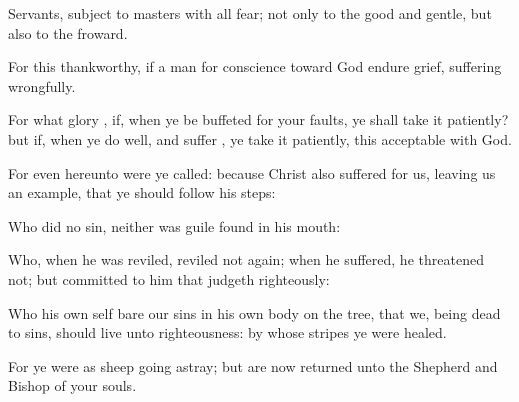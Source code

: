 {Servants,
{}
subject
to
{}
masters
with
all
fear;
not
only to the
good
and
gentle,
but
also to the
froward.

For
this
{}
thankworthy,
if a
man
for
conscience toward
God
endure
grief,
suffering
wrongfully.

For
what
glory
{},
if,
when ye be
buffeted for your
faults, ye shall take it
patiently?
but
if, when ye do
well,
and
suffer
{}, ye take it
patiently,
this
{}
acceptable
with
God.

For
even
hereunto were ye
called:
because
Christ
also
suffered
for
us,
leaving
us an
example,
that ye should
follow
his
steps:

Who
did
no
sin,
neither
was
guile
found
in
his
mouth:

Who, when he was
reviled,
reviled
not
again; when he
suffered, he
threatened
not;
but
committed
{} to him that
judgeth
righteously:

Who his own
self
bare
our
sins
in his
own
body
on the
tree,
that
we, being
dead to
sins, should
live unto
righteousness: by
whose
stripes ye were
healed.

For ye
were
as
sheep going
astray;
but
are
now
returned
unto the
Shepherd
and
Bishop of
your
souls.




\par }
